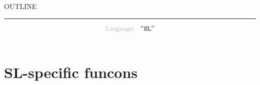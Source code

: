 


    OUTLINE
  \tableofcontents
\begin{center}
\rule{3in}{0.4pt}
\end{center}

\begin{displaymath}
\KEY{Language} \quad \STRING{SL}
\end{displaymath}

\begin{align*}
  [ \
  \KEY{Funcon} \quad & \NAMEREF{sl-to-string} \\
  \KEY{Funcon} \quad & \NAMEREF{integer-add-else-string-append} \\
  \KEY{Funcon} \quad & \NAMEREF{int} \\
  \KEY{Funcon} \quad & \NAMEREF{bool} \\
  \KEY{Funcon} \quad & \NAMEREF{str} \\
  \KEY{Funcon} \quad & \NAMEREF{obj} \\
  \KEY{Funcon} \quad & \NAMEREF{fun} \\
  \KEY{Funcon} \quad & \NAMEREF{scope-closed} \\
  \KEY{Funcon} \quad & \NAMEREF{initialise-local-variables} \\
  \KEY{Funcon} \quad & \NAMEREF{local-variable} \\
  \KEY{Funcon} \quad & \NAMEREF{local-variable-initialise} \\
  \KEY{Funcon} \quad & \NAMEREF{local-variable-assign} \\
  \KEY{Funcon} \quad & \NAMEREF{initialise-global-bindings} \\
  \KEY{Funcon} \quad & \NAMEREF{override-global-bindings} \\
  \KEY{Funcon} \quad & \NAMEREF{global-bound} \\
  \KEY{Funcon} \quad & \NAMEREF{read-line} \\
  \KEY{Funcon} \quad & \NAMEREF{print-line}
  \ ]
\end{align*}
\section{SL-specific funcons}\hypertarget{sl-specific-funcons}{}\label{sl-specific-funcons}

